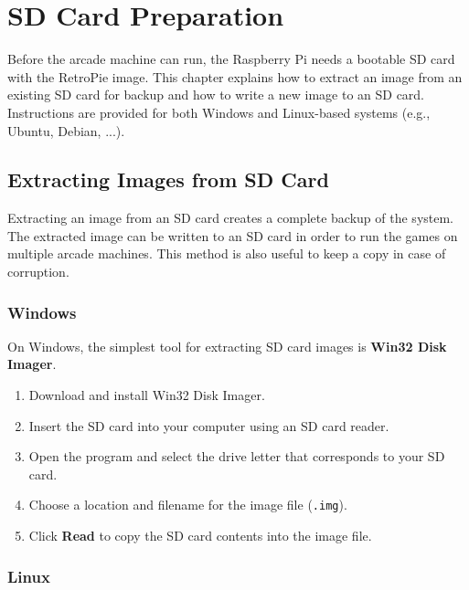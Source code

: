 \chapter{SD Card Preparation}
\label{cha:sd_card_preparation}

Before the arcade machine can run, the Raspberry Pi needs a bootable SD card with the RetroPie image. This chapter explains how to extract an image from an existing SD card for backup and how to write a new image to an SD card. Instructions are provided for both Windows and Linux-based systems (e.g., Ubuntu, Debian, ...).  

\section{Extracting Images from SD Card}
\label{sec:extracting_images_sd_card}

Extracting an image from an SD card creates a complete backup of the system. The extracted image can be written to an SD card in order to run the games on multiple arcade machines. This method is also useful to keep a copy in case of corruption.  

\subsection{Windows}
\label{subsec:extracting_windows}

On Windows, the simplest tool for extracting SD card images is \textbf{Win32 Disk Imager}.  
\begin{enumerate}
  \item Download and install Win32 Disk Imager.  
  \item Insert the SD card into your computer using an SD card reader.  
  \item Open the program and select the drive letter that corresponds to your SD card.  
  \item Choose a location and filename for the image file (\texttt{.img}).  
  \item Click \textbf{Read} to copy the SD card contents into the image file.  
\end{enumerate}

\subsection{Linux}
\label{subsec:extracting_linux}

